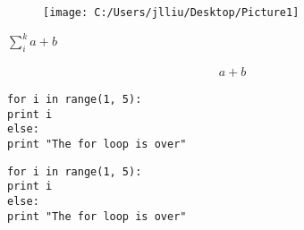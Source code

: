 \documentclass{article}
\begin{document}
\newpage
\begin{figure}[h]
	\centering
	\texttt{[image: C:/Users/jlliu/Desktop/Picture1]}
	\caption{}
	\label{fig:Picture1}
\end{figure}

$\sum_i^k{a+b}$ 

\begin{align*}
a+b
\end{align*}



\begin{verbatim}
for i in range(1, 5):
print i
else:
print "The for loop is over"
\end{verbatim}



\begin{lstlisting}[frame=single]  
for i in range(1, 5):
print i
else:
print "The for loop is over"
\end{lstlisting}
\end{document}
